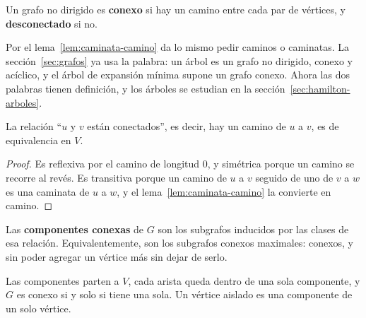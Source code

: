 \documentclass[11pt,letterpaper]{article}
\begin{document}
\begin{definicion}[Conexo]
  \label{def:conexo}
  Un grafo no dirigido es \textbf{conexo} si hay un camino entre cada
  par de vértices, y \textbf{desconectado} si no.
\end{definicion}

Por el lema~\ref{lem:caminata-camino} da lo mismo pedir caminos o
caminatas. La sección~\ref{sec:grafos} ya usa la palabra: un árbol es
un grafo no dirigido, conexo y acíclico, y el árbol de expansión
mínima supone un grafo conexo. Ahora las dos palabras tienen
definición, y los árboles se estudian en la
sección~\ref{sec:hamilton-arboles}.

\begin{proposicion}
  \label{prop:conectados-equivalencia}
  La relación ``$u$ y $v$ están conectados'', es decir, hay un camino
  de $u$ a $v$, es de equivalencia en $V$.
\end{proposicion}

\begin{proof}
  Es reflexiva por el camino de longitud $0$, y simétrica porque un
  camino se recorre al revés. Es transitiva porque un camino de $u$ a
  $v$ seguido de uno de $v$ a $w$ es una caminata de $u$ a $w$, y el
  lema~\ref{lem:caminata-camino} la convierte en camino.
\end{proof}

\begin{definicion}
  \label{def:componente-conexa}
  Las \textbf{componentes conexas} de $G$ son los subgrafos inducidos
  por las clases de esa relación. Equivalentemente, son los subgrafos
  conexos maximales: conexos, y sin poder agregar un vértice más sin
  dejar de serlo.
\end{definicion}

Las componentes parten a $V$, cada arista queda dentro de una sola
componente, y $G$ es conexo si y solo si tiene una sola. Un vértice
aislado es una componente de un solo vértice.
\end{document}
